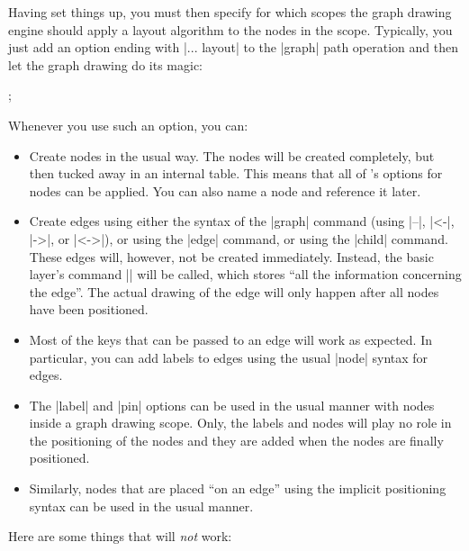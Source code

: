 Having set things up, you must then specify for which scopes the graph drawing
engine should apply a layout algorithm to the nodes in the scope. Typically,
you just add an option ending with |... layout| to the |graph| path operation
and then let the graph drawing do its magic:
%
\begin{codeexample}[]
  ;
\end{codeexample}

Whenever you use such an option, you can:
%
\begin{itemize}
    \item Create nodes in the usual way. The nodes will be created completely,
        but then tucked away in an internal table. This means that all of
        \tikzname's options for nodes can be applied. You can also name a node
        and reference it later.
    \item Create edges using either the syntax of the |graph| command (using
        |--|, |<-|, |->|, or |<->|), or using the |edge| command, or using the
        |child| command. These edges will, however, not be created immediately.
        Instead, the basic layer's command |\pgfgdedge| will be called, which
        stores ``all the information concerning the edge''. The actual drawing
        of the edge will only happen after all nodes have been positioned.
    \item Most of the keys that can be passed to an edge will work as expected.
        In particular, you can add labels to edges using the usual |node|
        syntax for edges.
    \item The |label| and |pin| options can be used in the usual manner with
        nodes inside a graph drawing scope. Only, the labels and nodes will
        play no role in the positioning of the nodes and they are added when
        the nodes are finally positioned.
    \item Similarly, nodes that are placed ``on an edge'' using the implicit
        positioning syntax can be used in the usual manner.
\end{itemize}
%
Here are some things that will \emph{not} work:
%
